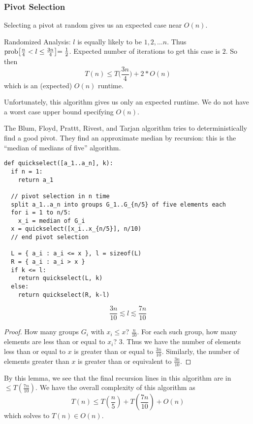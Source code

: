 \documentclass[12pt]{article}
\begin{document}
\subsubsection{Pivot Selection}
Selecting a pivot at random gives us an expected case near $O(n)$.

Randomized Analysis: $l$ is equally likely to be $1, 2,\dots n$. Thus $\text{prob}\bigl[\frac{n}{4} < l \leq \frac{3n}{4}\bigl] = \frac{1}{2}$. Expected number of iterations to get this case is $2$. So then \[ T(n) \leq T\bigg(\frac{3n}{4}\bigg) + 2 * O(n) \] which is an (expected) $O(n)$ runtime.

Unfortunately, this algorithm gives us only an expected runtime. We do not have a worst case upper bound specifying $O(n)$.

The Blum, Floyd, Prattt, Rivest, and Tarjan algorithm tries to deterministically find a good pivot. They find an approximate median by recursion: this is the ``median of medians of five'' algorithm.
\begin{verbatim}
def quickselect([a_1..a_n], k):
  if n = 1:
    return a_1

  // pivot selection in n time
  split a_1..a_n into groups G_1..G_{n/5} of five elements each
  for i = 1 to n/5:
    x_i = median of G_i
  x = quickselect([x_i..x_{n/5}], n/10)
  // end pivot selection

  L = { a_i : a_i <= x }, l = sizeof(L)
  R = { a_i : a_i > x }
  if k <= l:
    return quickselect(L, k)
  else:
    return quickselect(R, k-l)
\end{verbatim}

\begin{lemma}
\[ \frac{3n}{10} \lesssim l \lesssim \frac{7n}{10} \]
\end{lemma}

\begin{proof}
How many groups $G_i$ with $x_i \leq x$? $\frac{n}{10}$. For each such group, how many elements are less than or equal to $x_i$? $3$. Thus we have the number of elements less than or equal to $x$ is greater than or equal to $\frac{3n}{10}$. Similarly, the number of elements greater than $x$ is greater than or equivalent to $\frac{3n}{10}$.
\end{proof}

By this lemma, we see that the final recursion lines in this algorithm are in $\leq T(\frac{7n}{10})$. We have the overall complexity of this algorithm as \[ T(n) \leq T(\frac{n}{5}) + T(\frac{7n}{10}) + O(n) \] which solves to $T(n) \in O(n)$.
\end{document}

